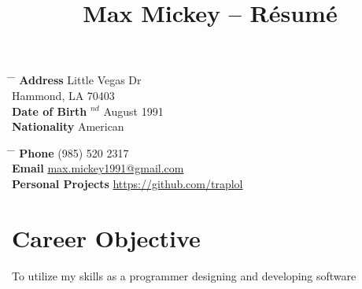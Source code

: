 \documentclass[10pt]{article} %
\begin{document}

\title{Max Mickey -- Résumé} %


\parbox{0.5\textwidth}{ %
\begin{tabbing} %
\hspace{3cm} \= \hspace{4cm} \= \kill %
{\bf Address}  Little Vegas Dr\\ %
\> Hammond, LA 70403 \\ %
{\bf Date of Birth} $^{nd}$ August 1991 \\ %
{\bf Nationality} \> American %
\end{tabbing}}
\hfill %
\parbox{0.5\textwidth}{ %
\begin{tabbing} %
\hspace{3cm} \= \hspace{4cm} \= \kill %
{\bf Phone} \> (985) 520 2317 \\ %
{\bf Email} \> \href{mailto:max.mickey1991@gmail.com}{max.mickey1991@gmail.com} \\ %
{\bf Personal Projects} \> \href{https://github.com/traplol}{https://github.com/traplol}
\end{tabbing}}


\section{Career Objective}

To utilize my skills as a programmer designing and developing software

\end{document}
